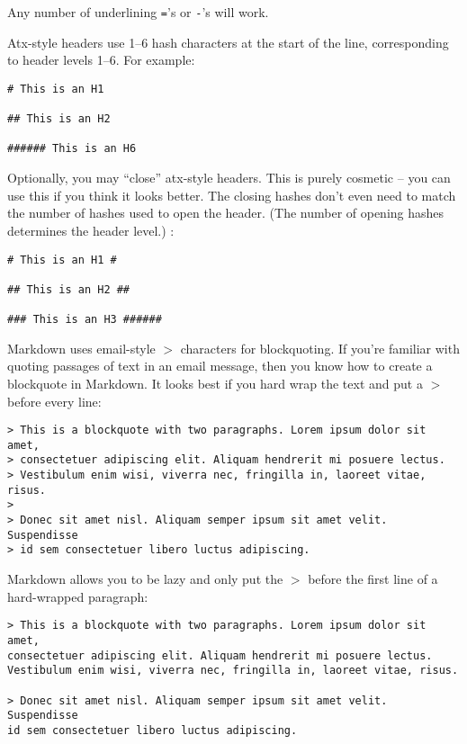 Any number of underlining \texttt{=}'s or \texttt{-}'s will work.

Atx-style headers use 1--6 hash characters at the start of the line,
corresponding to header levels 1--6. For example:

\begin{verbatim}
# This is an H1

## This is an H2

###### This is an H6
\end{verbatim}

Optionally, you may ``close'' atx-style headers. This is purely
cosmetic -- you can use this if you think it looks better. The
closing hashes don't even need to match the number of hashes
used to open the header. (The number of opening hashes
determines the header level.) :

\begin{verbatim}
# This is an H1 #

## This is an H2 ##

### This is an H3 ######
\end{verbatim}

Markdown uses email-style \texttt{$>$} characters for blockquoting. If you're
familiar with quoting passages of text in an email message, then you
know how to create a blockquote in Markdown. It looks best if you hard
wrap the text and put a \texttt{$>$} before every line:

\begin{verbatim}
> This is a blockquote with two paragraphs. Lorem ipsum dolor sit amet,
> consectetuer adipiscing elit. Aliquam hendrerit mi posuere lectus.
> Vestibulum enim wisi, viverra nec, fringilla in, laoreet vitae, risus.
> 
> Donec sit amet nisl. Aliquam semper ipsum sit amet velit. Suspendisse
> id sem consectetuer libero luctus adipiscing.
\end{verbatim}

Markdown allows you to be lazy and only put the \texttt{$>$} before the first
line of a hard-wrapped paragraph:

\begin{verbatim}
> This is a blockquote with two paragraphs. Lorem ipsum dolor sit amet,
consectetuer adipiscing elit. Aliquam hendrerit mi posuere lectus.
Vestibulum enim wisi, viverra nec, fringilla in, laoreet vitae, risus.

> Donec sit amet nisl. Aliquam semper ipsum sit amet velit. Suspendisse
id sem consectetuer libero luctus adipiscing.
\end{verbatim}

